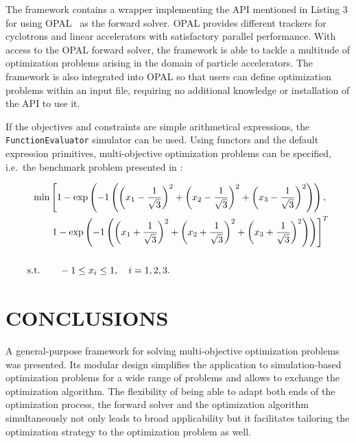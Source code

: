 \documentclass[preprint,linenumbers,amsmath,amssymb,aps,prstab]{revtex4-1}%
\begin{document}
The framework contains a wrapper implementing the API mentioned in
  Listing 3 for using \textsc{OPAL}~\cite{opal} as the forward solver.
\textsc{OPAL} provides different trackers for cyclotrons and linear
  accelerators with satisfactory parallel performance. 
With access to the \textsc{OPAL} forward solver, the framework is able to
  tackle a multitude of optimization problems arising in the domain of
  particle accelerators.
  The framework is also integrated into \textsc{OPAL} so that users can 
  define optimization problems within an input file, requiring no 
  additional knowledge or installation of the API to use it.


If the objectives and constraints are simple arithmetical expressions, 
the \texttt{FunctionEvaluator} simulator can be used.
Using functors and the default expression primitives, 
multi-objective optimization problems can be specified, 
i.e.\ the benchmark problem presented in \cite{hbwh:05}:
%

	\begin{widetext}
		\begin{align} \label{eqn:bench}
		\text{min} & \left[ 1 - \exp \left( -1 \left(
		\left(x_1 - \frac{1}{\sqrt{3}} \right)^2 +
		\left(x_2 - \frac{1}{\sqrt{3}} \right)^2 +
		\left(x_3 - \frac{1}{\sqrt{3}} \right)^2 \right)\right), \right. \\
		\vspace{3em} 
		& \left. 1 - \exp \left( -1 \left(
		\left(x_1 + \frac{1}{\sqrt{3}} \right)^2 +
		\left(x_2 + \frac{1}{\sqrt{3}} \right)^2 +
		\left(x_3 + \frac{1}{\sqrt{3}} \right)^2 \right)\right) \right]^T \nonumber \\
		\vspace{3em} \nonumber \\
		\text{s.t.} \quad & \quad -1 \le x_i \le 1, \quad i=1,2,3 \nonumber
		\text{.} \nonumber
		\end{align}
	\end{widetext}


 

\section{CONCLUSIONS} \label{sec:conclusions}

A general-purpose framework for solving multi-objective
  optimization problems was presented.
Its modular design simplifies the application to simulation-based optimization
  problems for a wide range of problems and allows to exchange the
  optimization algorithm.
The flexibility of being able to adapt both ends of the optimization
  process, the forward solver and the optimization algorithm simultaneously
  not only leads to broad applicability but it facilitates
  tailoring the optimization strategy to the optimization problem as well.
\end{document}
